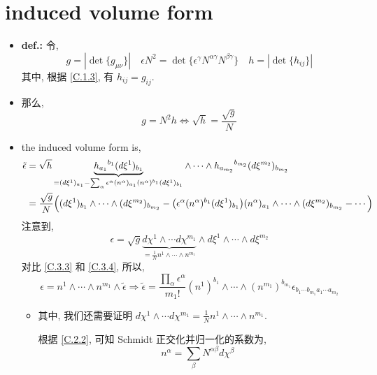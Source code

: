 \section{induced volume form}
\begin{itemize}
	\item \textbf{def.:} 令,
	\begin{equation}
		g = |\det \{g_{\mu \nu}\}| \quad \epsilon N^2 = \det \{\epsilon^\gamma N^{\alpha \gamma} N^{\beta \gamma}\} \quad h = |\det \{h_{i j}\}|
	\end{equation}
	其中, 根据 \eqref{C.1.3}, 有 $h_{i j} = g_{i j}$.
	
	\item 那么,
	\begin{equation}
		g = N^2 h \iff \sqrt{h} = \frac{\sqrt{g}}{N}
	\end{equation}
	
	\item the induced volume form is,
	\begin{align}
		\tilde{\epsilon} &= \sqrt{h} \underbrace{{h_{a_1}}^{b_1} (d\xi^1)_{b_1}}_{= (d\xi^1)_{a_1} - \sum_\alpha \epsilon^\alpha (n^\alpha)_{a_1} (n^\alpha)^{b_1} (d\xi^1)_{b_1}} \wedge \cdots \wedge {h_{a_{m_2}}}^{b_{m_2}} (d\xi^{m_2})_{b_{m_2}} \notag \\
		&= \frac{\sqrt{g}}{N} \Big( (d\xi^1)_{b_1} \wedge \cdots \wedge (d\xi^{m_2})_{b_{m_2}} - \big( \epsilon^\alpha (n^\alpha)^{b_1} (d\xi^1)_{b_1} \big) (n^\alpha)_{a_1} \wedge \cdots \wedge (d\xi^{m_2})_{b_{m_2}} - \cdots \Big) \label{C.3.3}
	\end{align}
	注意到,
	\begin{equation} \label{C.3.4}
		\epsilon = \sqrt{g} \underbrace{d\chi^1 \wedge \cdots d\chi^{m_1}}_{= \frac{1}{N} n^1 \wedge \cdots \wedge n^{m_1}} \wedge d\xi^1 \wedge \cdots \wedge d\xi^{m_2}
	\end{equation}
	对比 \eqref{C.3.3} 和 \eqref{C.3.4}, 所以,
	\begin{equation}
		\epsilon = n^1 \wedge \cdots \wedge n^{m_1} \wedge \tilde{\epsilon} \Longrightarrow \tilde{\epsilon} = \frac{\prod_\alpha \epsilon^\alpha}{m_1 !} (n^1)^{b_1} \wedge \cdots \wedge (n^{m_1})^{b_{m_1}} \epsilon_{b_1 \cdots b_{m_1} a_1 \cdots a_{m_2}}
	\end{equation}
	\begin{itemize}
		\item 其中, 我们还需要证明 $d\chi^1 \wedge \cdots d\chi^{m_1} = \frac{1}{N} n^1 \wedge \cdots \wedge n^{m_1}$.
		
		\begin{tcolorbox}[title=proof:]
			根据 \eqref{C.2.2}, 可知 Schmidt 正交化并归一化的系数为,
			\begin{equation}
				n^\alpha = \sum_\beta N^{\alpha \beta} d\chi^\beta
			\end{equation}
			

\end{tcolorbox}
\end{itemize}
\end{itemize}
